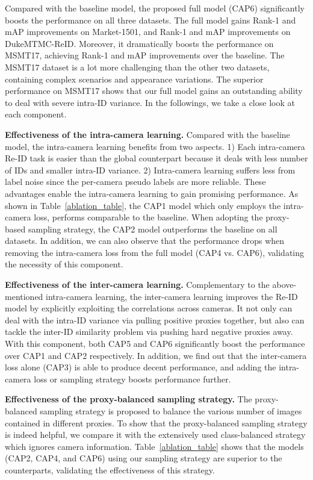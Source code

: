 \documentclass[letterpaper]{article} \usepackage{aaai21}  \usepackage{times}  \usepackage{helvet} \usepackage{courier}  \usepackage[hyphens]{url}  \usepackage{graphicx} \usepackage{subcaption}
\begin{document}
Compared with the baseline model, the proposed full model (CAP6) significantly boosts the performance on all three datasets. The full model gains  Rank-1 and  mAP improvements on Market-1501, and  Rank-1 and  mAP improvements on DukeMTMC-ReID. Moreover, it dramatically boosts the performance on MSMT17, achieving  Rank-1 and  mAP improvements over the baseline. The MSMT17 dataset is a lot more challenging than the other two datasets, containing complex scenarios and appearance variations. The superior performance on MSMT17 shows that our full model gains an outstanding ability to deal with severe intra-ID variance. In the followings, we take a close look at each component. 



\textbf{Effectiveness of the intra-camera learning.}
Compared with the baseline model, the intra-camera learning benefits from two aspects. 1) Each intra-camera Re-ID task is easier than the global counterpart because it deals with less number of IDs and smaller intra-ID variance. 2) Intra-camera learning suffers less from label noise since the per-camera pseudo labels are more reliable. These advantages enable the intra-camera learning to gain promising performance. As shown in Table~\ref{ablation_table}, the CAP1 model which only employs the intra-camera loss, performs comparable to the baseline. When adopting the proxy-based sampling strategy, the CAP2 model outperforms the baseline on all datasets. In addition, we can also observe that the performance drops when removing the intra-camera loss from the full model (CAP4 vs. CAP6), validating the necessity of this component. 




\textbf{Effectiveness of the inter-camera learning.} Complementary to the above-mentioned intra-camera learning, the inter-camera learning improves the Re-ID model by explicitly exploiting the correlations across cameras. It not only can deal with the intra-ID variance via pulling positive proxies together, but also can tackle the inter-ID similarity problem via pushing hard negative proxies away. 
With this component, both CAP5 and CAP6 significantly boost the performance over CAP1 and CAP2 respectively. In addition, we find out that the inter-camera loss alone (CAP3) is able to produce decent performance, and adding the intra-camera loss or sampling strategy boosts performance further.




\textbf{Effectiveness of the proxy-balanced sampling strategy.} The proxy-balanced sampling strategy is proposed to balance the various number of images contained in different proxies. To show that the proxy-balanced sampling strategy is indeed helpful, we compare it with the extensively used class-balanced strategy which ignores camera information. Table~\ref{ablation_table} shows that the models (CAP2, CAP4, and CAP6) using our sampling strategy are superior to the counterparts, validating the effectiveness of this strategy. 
\end{document}
